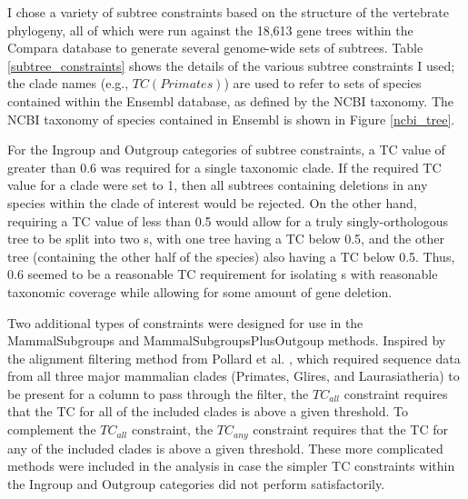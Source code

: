 I chose a variety of subtree constraints based on the structure of the
vertebrate phylogeny, all of which were run against the 18,613 gene
trees within the Compara database to generate several genome-wide sets
of subtrees. Table \ref{subtree_constraints} shows the details of the
various subtree constraints I used; the clade names (e.g.,
$TC(Primates)$) are used to refer to sets of species contained within
the Ensembl database, as defined by the NCBI taxonomy. The NCBI
taxonomy of species contained in Ensembl is shown in Figure
\ref{ncbi_tree}.

For the Ingroup and Outgroup categories of subtree constraints, a TC
value of greater than 0.6 was required for a single taxonomic
clade. If the required TC value for a clade were set to 1, then all
subtrees containing deletions in any species within the clade of
interest would be rejected. On the other hand, requiring a TC value of
less than 0.5 would allow for a truly singly-orthologous tree to be
split into two \subtr{}s, with one tree having a TC below 0.5, and the
other tree (containing the other half of the species) also having a TC
below 0.5. Thus, 0.6 seemed to be a reasonable TC requirement for
isolating \subtr{}s with reasonable taxonomic coverage while allowing
for some amount of gene deletion.

Two additional types of constraints were designed for use in the
MammalSubgroups and MammalSubgroupsPlusOutgoup methods. Inspired by
the alignment filtering method from Pollard et al. \citeyearpar{TODO},
which required sequence data from all three major mammalian clades
(Primates, Glires, and Laurasiatheria) to be present for a column to
pass through the filter, the $TC_{all}$ constraint requires that the
TC for all of the included clades is above a given threshold. To
complement the $TC_{all}$ constraint, the $TC_{any}$ constraint
requires that the TC for any of the included clades is above a given
threshold. These more complicated methods were included in the
analysis in case the simpler TC constraints within the Ingroup and
Outgroup categories did not perform satisfactorily.

